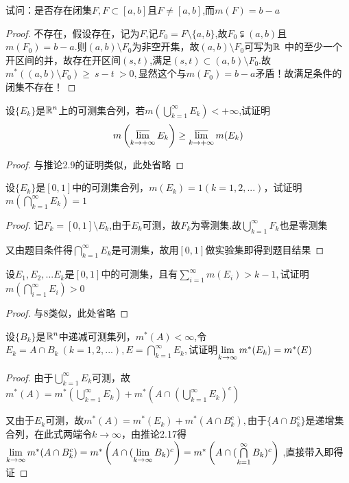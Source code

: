 试问：是否存在闭集$F,F\subset [a,b]$且$F\neq[a,b]$,而$m(F)=b-a$
\begin{proof}
	不存在，假设存在，记为$F$,记$F_0=F\setminus\{a,b\}$,故$F_0\subsetneqq (a,b)$且$m(F_0)=b-a$.则$(a,b)\setminus F_0$为非空开集，故$(a,b)\setminus F_0$可写为$\R{R}{\ }$中的至少一个开区间的并，故存在开区间$(s,t)$,满足$(s,t)\subset (a,b)\setminus F_0$.故$m^*\left((a,b)\setminus F_0 \right)\geq \ s-t\ >0, $显然这个与$m(F_0)=b-a$矛盾！故满足条件的闭集不存在！
\end{proof}

设$\{E_k\}$是$\mathbb{R}^{n}$上的可测集合列，若$m\left(\bigcup\limits_{k=1}^{\infty}E_k \right)<+\infty $,试证明$$m\left(\varlimsup_{k \to +\infty}E_k \right)\geq \varlimsup\limits_{k \to +\infty}m(E_k) $$
\begin{proof}
	与推论2.9的证明类似，此处省略
\end{proof}



设$\{E_k\}$是$[0,1]$中的可测集合列，$m(E_k)=1(k=1,2,...)$，试证明$m\left( \bigcap\limits_{k=1}^{\infty}E_k\right)=1 $
\begin{proof}
	记$F_k=[0,1]\setminus E_k$,由于$E_k$可测，故$F_k$为零测集.故$\bigcup\limits_{k=1}^{\infty}F_k$也是零测集\par 
	又由题目条件得$\bigcap\limits_{k=1}^{\infty}E_k$是可测集，故用$[0,1]$做实验集即得到题目结果
\end{proof}


设$E_1,E_2,...E_k$是$[0,1]$中的可测集，且有$\sum\limits_{i=1}^{\infty}m(E_i)>k-1,$试证明$m\left(\bigcap\limits_{i=1}^{\infty}E_i \right)>0 $
\begin{proof}
	与8类似，此处省略
\end{proof}


设$\{B_k\}$是$\mathbb{R}^{n}$中递减可测集列，$m^*(A)<\infty$,令$E_k=A\cap B_k\ (k=1,2,...),E=\bigcap\limits_{k=1}^{\infty}E_k,$试证明$\lim\limits_{k\to\infty}m^*(E_k)=m^*(E)$
\begin{proof}
	由于$\bigcup\limits_{k=1}^{\infty}E_k$可测，故$m^*(A)=m^*(\bigcup\limits_{k=1}^{\infty}E_k)+m^*\left(A\cap (\bigcup\limits_{k=1}^{\infty}E_k)^c \right) $\par
	又由于$E_k$可测，故$m^*(A)=m^*(E_k)+m^*(A\cap B_k^c),$由于$\{A\cap B_k^c\}$是递增集合列，在此式两端令$k\to\infty$，由推论2.17得$\lim\limits_{k\to\infty}m^*(A\cap B_k^c)=m^*\left( A\cap(  \lim\limits_{k\to\infty}B_k) ^c\right)=m^*\left( A\cap(  \bigcap\limits_{k=1}^{\infty}B_k) ^c\right) $ ,直接带入即得证
\end{proof}


